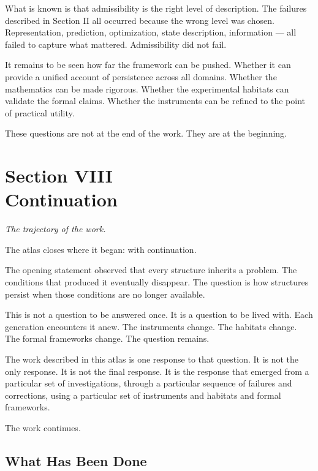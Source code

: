 \documentclass[12pt, openany]{book}
\begin{document}
What is known is that admissibility is the right level of description.
The failures described in Section II all occurred because the wrong level
was chosen. Representation, prediction, optimization, state description,
information — all failed to capture what mattered. Admissibility did not
fail.

It remains to be seen how far the framework can be pushed. Whether it
can provide a unified account of persistence across all domains. Whether
the mathematics can be made rigorous. Whether the experimental habitats
can validate the formal claims. Whether the instruments can be refined
to the point of practical utility.

These questions are not at the end of the work. They are at the beginning.

\cleardoublepage

\chapter[Continuation]{Section VIII \\ Continuation}

\noindent\textit{The trajectory of the work.}

\bigskip

\noindent The atlas closes where it began: with continuation.

The opening statement observed that every structure inherits a problem.
The conditions that produced it eventually disappear. The question is how
structures persist when those conditions are no longer available.

This is not a question to be answered once. It is a question to be lived
with. Each generation encounters it anew. The instruments change. The
habitats change. The formal frameworks change. The question remains.

The work described in this atlas is one response to that question. It is
not the only response. It is not the final response. It is the response
that emerged from a particular set of investigations, through a particular
sequence of failures and corrections, using a particular set of instruments
and habitats and formal frameworks.

The work continues.

\section{What Has Been Done}
\end{document}
